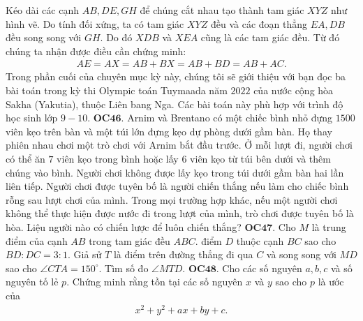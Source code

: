 \begin{multicols}{2}
\begin{figure}[H]
		\vspace*{-5pt}
	\end{figure}
	Kéo dài các cạnh $AB, DE, GH$ để chúng cắt nhau tạo thành tam giác $XYZ$ như hình vẽ. Do tính đối xứng, ta có tam giác $XYZ$ đều và các đoạn thẳng $EA, DB$ đều song song với $GH.$ Do đó $XDB$ và $XEA$  cũng là các tam giác đều. Từ đó chúng ta nhận được điều cần chứng minh:
	\begin{align*}
		AE \!=\! AX \!=\! AB \!+\! BX \!=\! AB \!+\! BD \!=\! AB \!+\! AC.
	\end{align*}
	Trong phần cuối của chuyên mục kỳ này, chúng tôi sẽ giới thiệu với bạn đọc ba bài toán trong kỳ thi Olympic toán Tuymaada năm $2022$ của nước cộng hòa Sakha (Yakutia), thuộc Liên bang Nga. Các bài toán này phù hợp với trình độ học sinh lớp $9-10$.
	\vskip 0.1cm
	{\bf\color{cackithi}OC$\pmb{46.}$} Arnim và Brentano có một chiếc bình nhỏ đựng $1500$ viên kẹo trên bàn và một túi lớn đựng kẹo dự phòng dưới gầm bàn. Họ thay phiên nhau chơi một trò chơi với Arnim bắt đầu trước. Ở mỗi lượt đi, người chơi có thể ăn $7$ viên kẹo trong bình hoặc lấy $6$ viên kẹo từ túi bên dưới và thêm chúng vào bình. Người chơi không được lấy kẹo trong túi dưới gầm bàn hai lần liên tiếp. Người chơi được tuyên bố là người chiến thắng nếu làm cho chiếc bình rỗng sau lượt chơi của mình. Trong mọi trường hợp khác, nếu một người chơi không thể thực hiện được nước đi trong lượt của mình, trò chơi được tuyên bố là hòa. Liệu người nào có chiến lược để luôn chiến thắng?
	\vskip 0.1cm
	{\bf\color{cackithi} OC$\pmb{47.}$} Cho $M$ là trung điểm của cạnh $AB$ trong tam giác đều $ABC$. điểm $D$ thuộc cạnh $BC$ sao cho $BD : DC = 3 : 1.$ Giả sử $T$ là điểm trên đường thẳng đi qua $C$ và song song với $MD$ sao cho $\angle CTA = 150^\circ$. Tìm số đo $\angle MTD$.
	\vskip 0.1cm
	{\bf\color{cackithi} OC$\pmb{48.}$} Cho các số nguyên $a, b, c$ và số nguyên tố lẻ $p.$ Chứng minh rằng tồn tại các số nguyên $x$ và $y$ sao cho $p$ là ước của
	\begin{align*}
		x^2 + y^2 +
		ax + by + c.
	\end{align*}
\end{multicols}